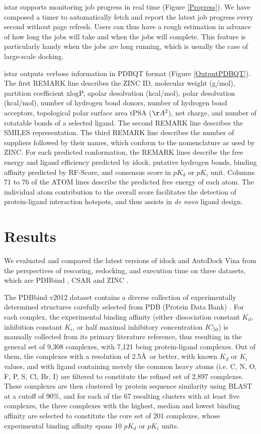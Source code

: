 \documentclass[10pt]{article}
\begin{document}
istar supports monitoring job progress in real time (Figure \ref{Progress}). We have composed a timer to automatically fetch and report the latest job progress every second without page refresh. Users can thus have a rough estimation in advance of how long the jobs will take and when the jobs will complete. This feature is particularly handy when the jobs are long running, which is usually the case of large-scale docking.

istar outputs verbose information in PDBQT format (Figure \ref{OutputPDBQT}). The first REMARK line describes the ZINC ID, molecular weight (g/mol), partition coefficient xlogP, apolar desolvation (kcal/mol), polar desolvation (kcal/mol), number of hydrogen bond donors, number of hydrogen bond acceptors, topological polar surface area tPSA ($\AA^2$), net charge, and number of rotatable bonds of a selected ligand. The second REMARK line describes the SMILES representation. The third REMARK line describes the number of suppliers followed by their names, which conform to the nomenclature as used by ZINC. For each predicted conformation, the REMARK lines describe the free energy and ligand efficiency predicted by idock, putative hydrogen bonds, binding affinity predicted by RF-Score, and consensus score in $pK_d$ or $pK_i$ unit. Columns 71 to 76 of the ATOM lines describe the predicted free energy of each atom. The individual atom contribution to the overall score facilitates the detection of protein-ligand interaction hotspots, and thus assists in \textit{de novo} ligand design.

\section*{Results}
We evaluated and compared the latest versions of idock and AutoDock Vina from the perspectives of rescoring, redocking, and execution time on three datasets, which are PDBbind \cite{529,530}, CSAR \cite{857,960} and ZINC \cite{532,1178}.

The PDBbind v2012 dataset contains a diverse collection of experimentally determined structures carefully selected from PDB (Protein Data Bank) \cite{540,537}. For each complex, the experimental binding affinity (either dissociation constant $K_d$, inhibition constant $K_i$, or half maximal inhibitory concentration $IC_{50}$) is manually collected from its primary literature reference, thus resulting in the general set of 9,308 complexes, with 7,121 being protein-ligand complexes. Out of them, the complexes with a resolution of 2.5\AA\ or better, with known $K_d$ or $K_i$ values, and with ligand containing merely the common heavy atoms (i.e. C, N, O, F, P, S, Cl, Br, I) are filtered to constitute the refined set of 2,897 complexes. These complexes are then clustered by protein sequence similarity using BLAST at a cutoff of 90\%, and for each of the 67 resulting clusters with at least five complexes, the three complexes with the highest, median and lowest binding affinity are selected to constitute the core set of 201 complexes, whose experimental binding affinity spans 10 $pK_d$ or $pK_i$ units.
\end{document}

